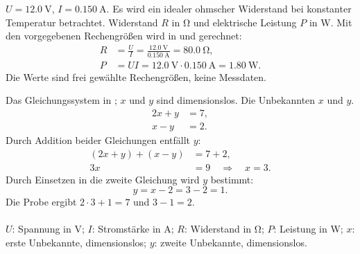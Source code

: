 \begin{exercise}
\label{ex:resistance}
\given $U=\qty{12.0}{\volt}$, $I=\qty{0.150}{\ampere}$.
Es wird ein idealer ohmscher Widerstand bei konstanter Temperatur betrachtet.
\find Widerstand $R$ in \unit{\ohm} und elektrische Leistung $P$ in \unit{\watt}.
\solution
Mit den vorgegebenen Rechengrößen wird in  und
 gerechnet:
\begin{align}
  R &= \frac{U}{I}
     = \frac{\qty{12.0}{\volt}}{\qty{0.150}{\ampere}}
     = \qty{80.0}{\ohm}, \label{eq:resistance}\\
  P &= UI
     = \qty{12.0}{\volt}\cdot\qty{0.150}{\ampere}
     = \qty{1.80}{\watt}. \label{eq:power}
\end{align}
Die Werte sind frei gewählte Rechengrößen, keine Messdaten.
\end{exercise}

\begin{exercise}
\label{ex:system}
\given Das Gleichungssystem in ; $x$ und $y$ sind dimensionslos.
\find Die Unbekannten $x$ und $y$.
\begin{equation}
  \begin{aligned}
    2x+y &= 7,\\
    x-y  &= 2.
  \end{aligned}
  \label{eq:system}
\end{equation}
\solution
Durch Addition beider Gleichungen entfällt $y$:
\begin{align*}
  (2x+y)+(x-y) &= 7+2,\\
  3x &= 9 \quad\Longrightarrow\quad x=3.
\end{align*}
Durch Einsetzen in die zweite Gleichung wird $y$ bestimmt:
\begin{equation*}
  y=x-2=3-2=1.
\end{equation*}
Die Probe ergibt $2\cdot3+1=7$ und $3-1=2$.
\end{exercise}

\paragraph*{}
$U$: Spannung in \unit{\volt}; $I$: Stromstärke in \unit{\ampere};
$R$: Widerstand in \unit{\ohm}; $P$: Leistung in \unit{\watt};
$x$: erste Unbekannte, dimensionslos; $y$: zweite Unbekannte, dimensionslos.
